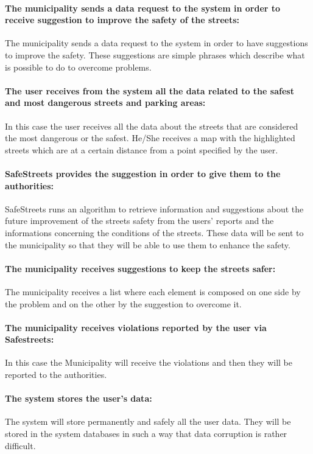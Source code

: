 \documentclass[titlepage]{article}
\begin{document}
\paragraph{The municipality sends a data request to the 				   system  in order to receive suggestion to improve 			   the 	safety 	of the streets: }
The municipality sends a data request to the system in order to have suggestions to improve the safety. These suggestions are simple phrases which describe what is possible to do to overcome problems.

\paragraph{The user receives from the system all the data 			related to the safest and most dangerous streets and parking areas: }
In this case the user receives all the data about the streets that are considered the most dangerous or the safest. He/She receives a map with the highlighted streets which are at a certain distance from a point specified by the user.

\paragraph{SafeStreets provides the suggestion in order to give them to the authorities: }
SafeStreets runs an algorithm to retrieve information and suggestions about the future improvement of the streets safety from the users' reports and the informations concerning the conditions of the streets. These data will be sent to the municipality so that they will be able to use them to enhance the safety.
\paragraph{The municipality receives suggestions to keep the streets safer: }
The municipality receives a list where each element is composed on one side by the problem and on the other by the suggestion to overcome it.
\paragraph{The municipality receives violations reported by the user via Safestreets:} In this case the Municipality will receive the violations and then they will be reported to the authorities.
\paragraph{The system stores the user's data:}
The system will store permanently and safely all the user data. They will be stored in the system databases in such a way that data corruption is rather difficult.
\end{document}
